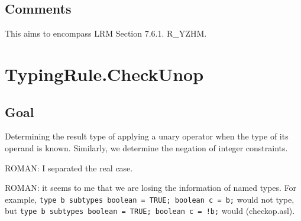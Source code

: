 \documentclass{book}
\begin{document}
\subsection{Comments}
    This aims to encompass LRM Section 7.6.1. R\_YZHM.

\section{TypingRule.CheckUnop \label{sec:TypingRule.CheckUnop}}

\subsection{Goal}
  Determining the result type of applying a unary operator when the type of its operand is known.
  Similarly, we determine the negation of integer constraints.

\begin{emptytodo}
ROMAN: I separated the real case.
\end{emptytodo}

\begin{emptytodo}
ROMAN: it seems to me that we are losing the information of named types. For example, \texttt{type b subtypes boolean = TRUE; boolean c = b;} would not type, but \texttt{type b subtypes boolean = TRUE; boolean c = !b;} would (checkop.asl).
\end{emptytodo}
\end{document}
